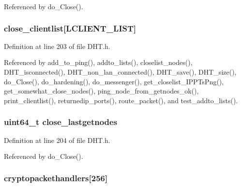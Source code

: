 Referenced by do\+\_\+\+Close().

\hypertarget{struct_d_h_t_a00ef35d5b0e7a791ef08a30b3bacbf9d}{
\subsubsection[{close\+\_\+clientlist}]{ close\+\_\+clientlist\mbox{[}{\bf L\+C\+L\+I\+E\+N\+T\+\_\+\+L\+I\+S\+T}\mbox{]}}}\label{struct_d_h_t_a00ef35d5b0e7a791ef08a30b3bacbf9d}


Definition at line 203 of file D\+H\+T.\+h.



Referenced by add\+\_\+to\+\_\+ping(), addto\+\_\+lists(), closelist\+\_\+nodes(), D\+H\+T\+\_\+isconnected(), D\+H\+T\+\_\+non\+\_\+lan\+\_\+connected(), D\+H\+T\+\_\+save(), D\+H\+T\+\_\+size(), do\+\_\+\+Close(), do\+\_\+hardening(), do\+\_\+messenger(), get\+\_\+closelist\+\_\+\+I\+P\+P\+Ts\+Png(), get\+\_\+somewhat\+\_\+close\+\_\+nodes(), ping\+\_\+node\+\_\+from\+\_\+getnodes\+\_\+ok(), print\+\_\+clientlist(), returnedip\+\_\+ports(), route\+\_\+packet(), and test\+\_\+addto\+\_\+lists().

\hypertarget{struct_d_h_t_a3ab563f182d86c5bc6322ee416a10a32}{
\subsubsection[{close\+\_\+lastgetnodes}]{\setlength{\rightskip}{0pt plus 5cm}uint64\+\_\+t close\+\_\+lastgetnodes}}\label{struct_d_h_t_a3ab563f182d86c5bc6322ee416a10a32}


Definition at line 204 of file D\+H\+T.\+h.



Referenced by do\+\_\+\+Close().

\hypertarget{struct_d_h_t_a461ccd9a581712b103785034f31d0d82}{
\subsubsection[{cryptopackethandlers}]{ cryptopackethandlers\mbox{[}256\mbox{]}}}\label{struct_d_h_t_a461ccd9a581712b103785034f31d0d82}


